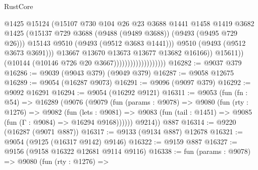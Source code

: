 \begin{lexlean}{RustCore}
\begin{coremodule}
                                                @1425
                                                @15124
                                                (@15107
                                                  @730
                                                  @104
                                                  @26
                                                  @23
                                                  @3688
                                                  @1441
                                                  @1458
                                                  @1419
                                                  @3682
                                                  @1425
                                                  (@15137
                                                    @729
                                                    @3688
                                                    (@9488 (@9489 @3688))
                                                    (@9493 (@9495 @729 @26)))
                                                  @15143
                                                  @9510
                                                  (@9493 (@9512 @3683 @1441)))
                                                @9510
                                                (@9493 (@9512 @3673 @3691)))
                                              @13667
                                              @13670
                                              @13673
                                              @13677
                                              @13682
                                              @16166))
                                          @15611))
                                      (@10144 (@10146 @726 @20 @3667)))))))))))))))))))
@16282 := @9037 @379
@16286 := @9039 (@9043 @379) (@9049 @379)
@16287 := @9058 @12675
@16289 := @9054 (@16287 @9073)
@16291 := @9096 (@9097 @379)
@16292 := @9092 @16291
@16294 := @9054 (@16292 @9121)
@16311 := @9053
    (fun (fn : @54) =>
    @16289
      (@9076
        (@9079
          (fun (params : @9078) =>
          @9080
            (fun (rty : @1276) =>
            @9082
              (fun (lets : @9081) =>
              @9083 (fun (tail : @1451) => @9085 (fun (Γ : @9084) => @16294 @9168))))))
        @9214))
    @887
@16314 := @9220 (@16287 (@9071 @887))
@16317 := @9133 (@9134 @887) @12678
@16321 := @9054 (@9125 (@16317 @9142) @9146)
@16322 := @9159 @887
@16327 := @9156 (@9158 @16322 @12681 @9114 @9116)
@16338 := fun (params : @9078) =>
  @9080
    (fun (rty : @1276) =>

\end{coremodule}
\end{lexlean}
